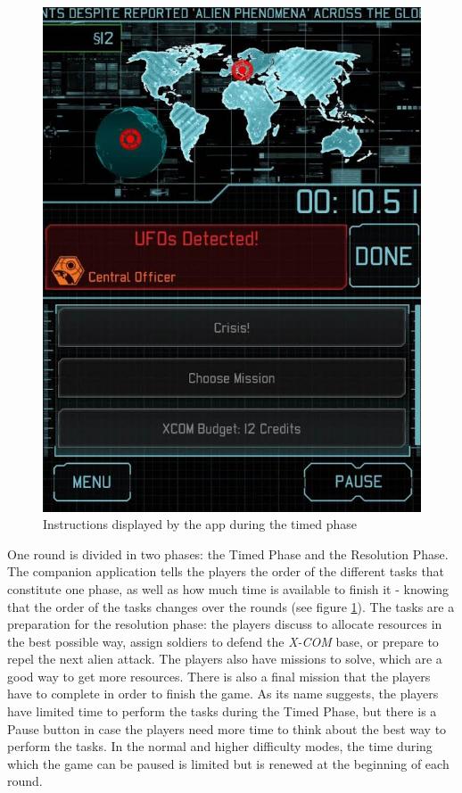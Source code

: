 \begin{figure}[!ht]
    \centering
    \includegraphics[scale=0.3]{Images/xcom_boardgame_app.jpg}
    \caption{Instructions displayed by the app during the timed phase}
    \label{fig:XCOMAPP}
\end{figure}


One round is divided in two phases: the Timed Phase and the Resolution Phase. The companion application tells the players the order of the different tasks that constitute one phase, as well as how much time is available to finish it - knowing that the order of the tasks changes over the rounds (see figure \ref{fig:XCOMAPP}). The tasks are a preparation for the resolution phase: the players discuss to allocate resources in the best possible way, assign soldiers to defend the \textit{X-COM} base, or prepare to repel the next alien attack. 
The players also have missions to solve, which are a good way to get more resources. There is also a final mission that the players have to complete in order to finish the game. As its name suggests, the players have limited time to perform the tasks during the Timed Phase, but there is a Pause button in case the players need more time to think about the best way to perform the tasks. In the normal and higher difficulty modes, the time during which the game can be paused is limited but is renewed at the beginning of each round.

